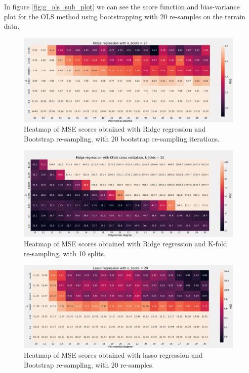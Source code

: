 In figure \ref{fig:g_ols_sub_plot} we can see the score function and bias-variance plot for the OLS method using bootstrapping with 20 re-samples on the terrain data.

\begin{figure}[H]
    \centering
    \includegraphics[width=\textwidth]{Figures/g_ridge_heatmap_boots_n_20.png}
    \caption{Heatmap of MSE scores obtained with Ridge regression and Bootstrap
    re-sampling, with 20 bootstrap re-sampling iterations.}  
    \label{fig:g_ridge_boost_heatmap}  
\end{figure}

\begin{figure}[H]
    \centering
    \includegraphics[width=\textwidth]{Figures/g_ridge_heatmap_kfold_n_10.png}
    \caption{Heatmap of MSE scores obtained with Ridge regression and K-fold
    re-sampling, with 10 splits.}  
    \label{fig:g_ridge_kfold_heatmap}  
\end{figure}

\begin{figure}[H]
    \centering
    \includegraphics[width=\textwidth]{Figures/g_lasso_heatmap_boost_n_20.png}
    \caption{Heatmap of MSE scores obtained with lasso regression and Bootstrap
    re-sampling, with 20 re-samples.}  
    \label{fig:g_lasso_boots_heatmap}  
\end{figure}

